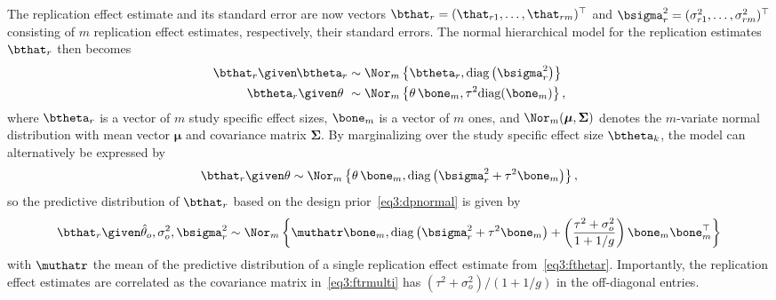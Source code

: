 The replication effect estimate and its standard error are now vectors
$\bthat_{r} = (\that_{r1}, \dots, \that_{rm})^{\top}$ and
$\bsigma^{2}_{r} = (\sigma^{2}_{r1}, \dots, \sigma^{2}_{rm})^{\top}$ consisting
of $m$ replication effect estimates, respectively, their standard errors. The
normal hierarchical model for the replication estimates $\bthat_{r}$ then
becomes
\begin{subequations}
\label{eq3:hierarch-model2}
\begin{align}
  \bthat_r \given \mspace{-1mu} \btheta_r &\sim \Nor_{m}\left\{\btheta_r, \text{diag}\left(\bsigma_r^2\right)\right\}
  \label{eq3:hat_theta_k22} \\
  \btheta_r \given \theta \,\,  &\sim \Nor_{m}\left\{\theta \, \bone_{m},
  \tau^2 \text{diag}(\bone_{m})\right\}, \label{eq3:theta_k2}
\end{align}
\end{subequations}
where $\btheta_{r}$ is a vector of $m$ study specific effect sizes, $\bone_{m}$
is a vector of $m$ ones, and $\Nor_{m}(\boldsymbol{\mu}, \boldsymbol{\Sigma})$
denotes the $m$-variate normal distribution with mean vector $\boldsymbol{\mu}$
and covariance matrix $\boldsymbol{\Sigma}$. By marginalizing over the study
specific effect size $\btheta_{k}$, the model can alternatively be expressed by
\begin{align}
  \bthat_r \given \theta \sim \Nor_{m}\left\{\theta \, \bone_{m},
\text{diag}\left(\bsigma_r^2 + \tau^2 \bone_{m}\right)\right\},
  \label{eq3:margimulti}
\end{align}
so the predictive distribution of $\bthat_r$ based on the design
prior~\eqref{eq3:dpnormal} is given by
\begin{align}
  \bthat_r \given \hat{\theta}_o, \sigma^{2}_{o}, \bsigma^{2}_{r}
  \sim \Nor_{m}\left\{\muthatr \bone_{m},
  \text{diag}\left(\bsigma_r^2 + \tau^2 \bone_{m}\right) +
  \left(\frac{\tau^{2} + \sigma^{2}_{o}}{1 + 1/g}\right)
  \bone_{m} \bone_{m}^{\top} \right\}
  \label{eq3:ftrmulti}
\end{align}
with $ \muthatr$ the mean of the predictive distribution of a single replication
effect estimate from~\eqref{eq3:fthetar}. Importantly, the replication effect
estimates are correlated as the covariance matrix in~\eqref{eq3:ftrmulti} has
$(\tau^2+\sigma^{2}_{o})/(1 + 1/g)$ in the off-diagonal entries.

